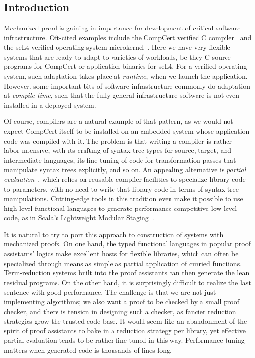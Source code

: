 \chapter{} \label{ch:rewriting}

\section{Introduction} \label{sec:rewriting:intro}


Mechanized proof is gaining in importance for development of critical software infrastructure.
Oft-cited examples include the CompCert verified C compiler~\cite{Compcert} and the seL4 verified operating-system microkernel~\cite{seL4SOSP09}.
Here we have very flexible systems that are ready to adapt to varieties of workloads, be they C source programs for CompCert or application binaries for seL4.
For a verified operating system, such adaptation takes place at \emph{runtime}, when we launch the application.
However, some important bits of software infrastructure commonly do adaptation at \emph{compile time}, such that the fully general infrastructure software is not even installed in a deployed system.

Of course, compilers are a natural example of that pattern, as we would not expect CompCert itself to be installed on an embedded system whose application code was compiled with it.
The problem is that writing a compiler is rather labor-intensive, with its crafting of syntax-tree types for source, target, and intermediate languages, its fine-tuning of code for transformation passes that manipulate syntax trees explicitly, and so on.
An appealing alternative is \emph{partial evaluation}~\cite{PartialEvaluation}, which relies on reusable compiler facilities to specialize library code to parameters, with no need to write that library code in terms of syntax-tree manipulations.
Cutting-edge tools in this tradition even make it possible to use high-level functional languages to generate performance-competitive low-level code, as in Scala's Lightweight Modular Staging~\cite{LMS}.

It is natural to try to port this approach to construction of systems with mechanized proofs.
On one hand, the typed functional languages in popular proof assistants' logics make excellent hosts for flexible libraries, which can often be specialized through means as simple as partial application of curried functions.
Term-reduction systems built into the proof assistants can then generate the lean residual programs.
On the other hand, it is surprisingly difficult to realize the last sentence with good performance.
The challenge is that we are not just implementing algorithms; we also want a proof to be checked by a small proof checker, and there is tension in designing such a checker, as fancier reduction strategies grow the trusted code base.
It would seem like an abandonment of the spirit of proof assistants to bake in a reduction strategy per library, yet effective partial evaluation tends to be rather fine-tuned in this way.
Performance tuning matters when generated code is thousands of lines long.

